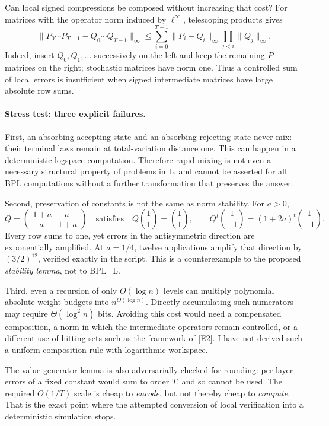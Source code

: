 \documentclass[11pt,a4paper]{article}
\newcommand{\eref}[2]{\hyperlink{extra:#1:#2}{[E#2]}}
\numberwithin{equation}{section}
\begin{document}
Can local signed compressions be composed without increasing that cost?
For matrices with the operator norm induced by $\ell^\infty$, telescoping
products gives
\begin{equation}\label{statement:product-error}
 \|P_0\cdots P_{T-1}-Q_0\cdots Q_{T-1}\|_\infty
 \le\sum_{i=0}^{T-1}
       \|P_i-Q_i\|_\infty
       \prod_{j<i}\|Q_j\|_\infty.
\end{equation}
Indeed, insert $Q_0, Q_1,\ldots$ successively on the left and keep the
remaining $P$ matrices on the right; stochastic matrices have norm one.
Thus a controlled sum of local errors is insufficient when signed
intermediate matrices have large absolute row sums.

\paragraph{Stress test: three explicit failures.}
First, an absorbing accepting state and an absorbing rejecting state
never mix: their terminal laws remain at total-variation distance one.
This can happen in a deterministic logspace computation. Therefore
rapid mixing is not even a necessary structural property of problems in
L, and cannot be asserted for all BPL computations without a further
transformation that preserves the answer.

Second, preservation of constants is not the same as norm stability.
For $a>0$,
\[
 Q=\begin{pmatrix}1+a&-a\\-a&1+a\end{pmatrix}
 \quad\text{satisfies}\quad
 Q\binom11=\binom11,
 \qquad Q^t\binom1{-1}=(1+2a)^t\binom1{-1}.
\]
Every row sums to one, yet errors in the antisymmetric direction are
exponentially amplified. At $a=1/4$, twelve applications amplify that
direction by $(3/2)^{12}$, verified exactly in the script. This is a
counterexample to the proposed \emph{stability lemma}, not to BPL=L.

Third, even a recursion of only $O(\log n)$ levels can multiply
polynomial absolute-weight budgets into $n^{O(\log n)}$. Directly
accumulating such numerators may require $\Theta(\log^2 n)$ bits.
Avoiding this cost would need a compensated composition, a norm in which
the intermediate operators remain controlled, or a different use of
hitting sets such as the framework of \eref{statement}{2}. I have not derived
such a uniform composition rule with logarithmic workspace.

The value-generator lemma is also adversarially checked for rounding:
per-layer errors of a fixed constant would sum to order $T$, and so
cannot be used. The required $O(1/T)$ scale is cheap to \emph{encode},
but not thereby cheap to \emph{compute}. That is the exact point where
the attempted conversion of local verification into a deterministic
simulation stops.
\end{document}
